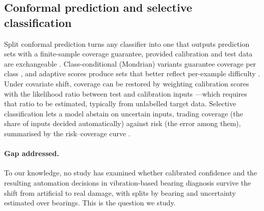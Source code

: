 \subsection{Conformal prediction and selective classification}

Split conformal prediction turns any classifier into one that outputs prediction sets with a finite-sample coverage
guarantee, provided calibration and test data are exchangeable \citep{vovk2005,angelopoulos2023}. Class-conditional
(Mondrian) variants guarantee coverage per class \citep{vovk2005}, and adaptive scores produce sets that better
reflect per-example difficulty \citep{romano2020}. Under covariate shift, coverage can be restored by weighting
calibration scores with the likelihood ratio between test and calibration inputs \citep{tibshirani2019}---which
requires that ratio to be estimated, typically from unlabelled target data. Selective classification lets a model
abstain on uncertain inputs, trading coverage (the share of inputs decided automatically) against risk (the error
among them), summarised by the risk--coverage curve \citep{geifman2017}.

\paragraph{Gap addressed.} To our knowledge, no study has examined whether calibrated confidence and the resulting
automation decisions in vibration-based bearing diagnosis survive the shift from artificial to real damage, with
splits by bearing and uncertainty estimated over bearings. This is the question we study.
